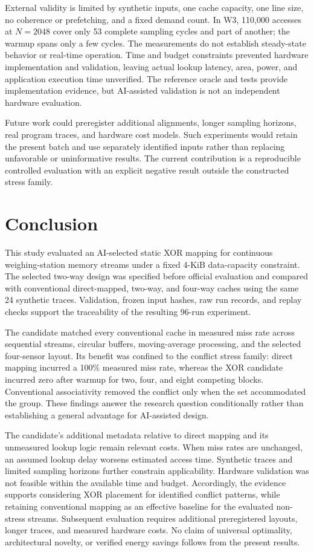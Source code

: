 \documentclass[11pt,a4paper]{article}
\begin{document}
External validity is limited by synthetic inputs, one cache capacity, one line size, no coherence or prefetching, and a fixed demand count. In W3, 110,000 accesses at $N=2048$ cover only 53 complete sampling cycles and part of another; the warmup spans only a few cycles. The measurements do not establish steady-state behavior or real-time operation. Time and budget constraints prevented hardware implementation and validation, leaving actual lookup latency, area, power, and application execution time unverified. The reference oracle and tests provide implementation evidence, but AI-assisted validation is not an independent hardware evaluation.

Future work could preregister additional alignments, longer sampling horizons, real program traces, and hardware cost models. Such experiments would retain the present batch and use separately identified inputs rather than replacing unfavorable or uninformative results. The current contribution is a reproducible controlled evaluation with an explicit negative result outside the constructed stress family.

\section{Conclusion}
This study evaluated an AI-selected static XOR mapping for continuous weighing-station memory streams under a fixed 4-KiB data-capacity constraint. The selected two-way design was specified before official evaluation and compared with conventional direct-mapped, two-way, and four-way caches using the same 24 synthetic traces. Validation, frozen input hashes, raw run records, and replay checks support the traceability of the resulting 96-run experiment.

The candidate matched every conventional cache in measured miss rate across sequential streams, circular buffers, moving-average processing, and the selected four-sensor layout. Its benefit was confined to the conflict stress family: direct mapping incurred a 100\% measured miss rate, whereas the XOR candidate incurred zero after warmup for two, four, and eight competing blocks. Conventional associativity removed the conflict only when the set accommodated the group. These findings answer the research question conditionally rather than establishing a general advantage for AI-assisted design.

The candidate's additional metadata relative to direct mapping and its unmeasured lookup logic remain relevant costs. When miss rates are unchanged, an assumed lookup delay worsens estimated access time. Synthetic traces and limited sampling horizons further constrain applicability. Hardware validation was not feasible within the available time and budget. Accordingly, the evidence supports considering XOR placement for identified conflict patterns, while retaining conventional mapping as an effective baseline for the evaluated non-stress streams. Subsequent evaluation requires additional preregistered layouts, longer traces, and measured hardware costs. No claim of universal optimality, architectural novelty, or verified energy savings follows from the present results.
\end{document}

